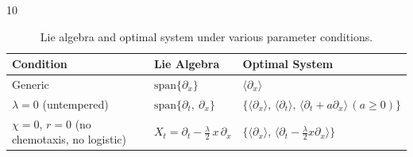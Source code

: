 \documentclass{article}
\begin{document}
\begin{thebibliography}{10}
%





\end{thebibliography}
\clearpage
\begin{small}
\begin{table}[h!]
    \centering
    \begin{tabular}{|l|l|l|}
        \hline
        \textbf{Condition} & \textbf{Lie Algebra} &  \textbf{Optimal System} \\
        \hline
        Generic & $\mathrm{span}\{\partial_x\}$ & $\langle\partial_x\rangle$\\
        \hline
        $\lambda=0$ (untempered) & $\mathrm{span}\{\partial_t,\ \partial_x\}$ & $\{\langle\partial_x\rangle,\, \langle\partial_t\rangle,\,\langle\partial_t + a\partial_x\rangle\,(a\geq 0)\}$ \\
        \hline
        $\chi=0$, $r=0$ (no chemotaxis, no logistic) & $X_t=\partial_t-\frac{\lambda}{2}\,x\,\partial_x$ & $\{\langle\partial_x\rangle,\, \langle\partial_t- \frac{\lambda}{2}x\partial_x\rangle\}$ \\
        \hline
    \end{tabular}
    \caption{Lie algebra and optimal system under various parameter conditions.}
    \label{tab:summary_symmetries}
\end{table}
\end{small}
\end{document}
